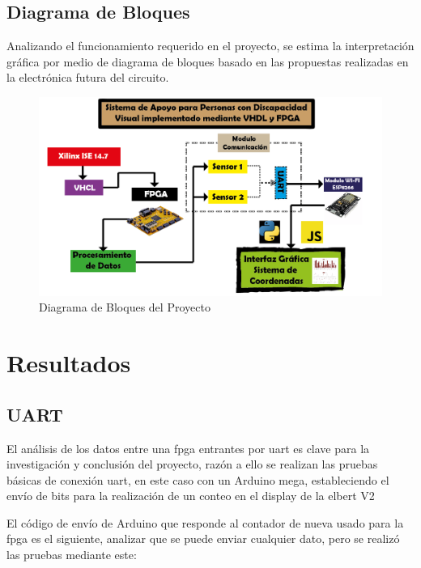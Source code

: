 \documentclass[osajnl,twocolumn,showpacs,superscriptaddress,10pt]{revtex4-1}
\begin{document}
\subsection{Diagrama de Bloques}

Analizando el funcionamiento requerido en el proyecto, se estima la interpretación gráfica por medio de diagrama de bloques basado en las propuestas realizadas en la electrónica futura del circuito. 

\begin{figure}[H]
    \centering
        \includegraphics[scale=0.29]{images/Mapa de flujo.png}
    \caption{Diagrama de Bloques del Proyecto}
    \label{fig:my_label}
\end{figure}


\section{Resultados}

\subsection{UART}

El análisis de los datos entre una fpga entrantes por uart es clave para la investigación y conclusión del proyecto, razón a ello se realizan las pruebas básicas de conexión uart, en este caso con un Arduino mega, estableciendo el envío de bits para la realización de un conteo en el display de la elbert V2 

El código de envío de Arduino que responde al contador de nueva usado para la fpga es el siguiente, analizar que se puede enviar cualquier dato, pero se realizó las pruebas mediante este:
\end{document}
